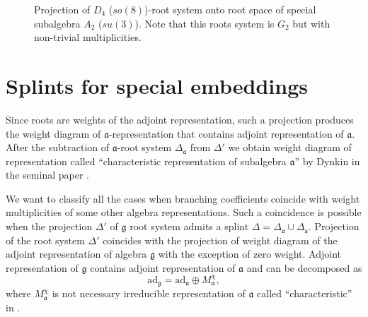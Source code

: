 \documentclass{article}
\newcommand{\gf}{\mathfrak{g}}
\newcommand{\af}{\mathfrak{a}}
\newcommand{\sfr}{\mathfrak{s}}
\begin{document}
\begin{figure}[h!bt]
  \noindent{}
  \caption{Projection of $D_{4}$ ($so(8)$)-root system onto root space of special subalgebra $A_{2}$
    ($su(3)$). Note that this roots system is $G_{2}$ but with non-trivial multiplicities. }
 \label{fig:d4-a2_splint}
\end{figure}



\section{Splints for special embeddings}
\label{sec:splints-spec-embedd}

Since roots are weights of the adjoint representation, such a projection produces the weight diagram
of $\af$-representation that contains adjoint representation of $\af$. After the subtraction of
$\af$-root system $\Delta_{\af}$ from $\Delta'$ we obtain weight diagram of representation called
``characteristic representation of subalgebra $\af$'' by Dynkin in the seminal paper
\cite{dynkin1952semisimple}.

We want to classify all the cases when branching coefficients coincide with weight multiplicities of
some other algebra representations. Such a coincidence is possible when the projection $\Delta'$ of
$\gf$ root system admits a splint $\Delta=\Delta_{\af}\cup \Delta_{\sfr}$. Projection of the root
system $\Delta'$ coincides with the projection of weight diagram of the adjoint representation of
algebra $\gf$ with the exception of zero weight. Adjoint representation of $\gf$ contains adjoint
representation of $\af$ and can be decomposed as
\begin{equation}
  \label{eq:3}
  \mathrm{ad}_{\gf}=\mathrm{ad}_{\af}\oplus M_{\af}^{\chi},
\end{equation}
where $M^{\chi}_{\af}$ is not necessary irreducible representation of $\af$ called
``characteristic'' in \cite{dynkin1952semisimple}. 
\end{document}
